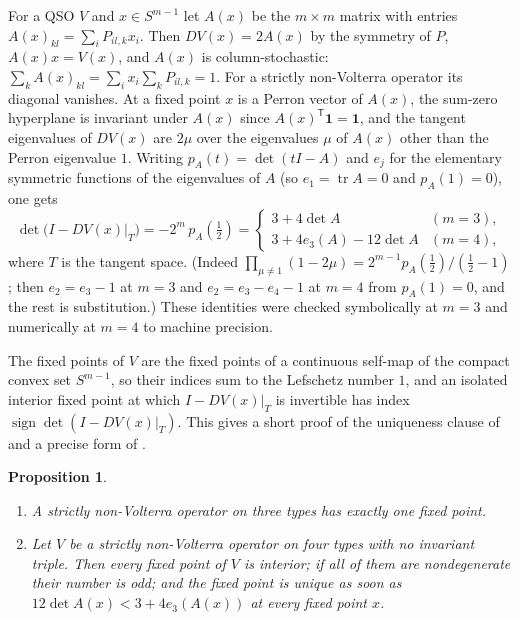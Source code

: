 \documentclass[11pt]{amsart}
\newtheorem{proposition}[theorem]{Proposition}
\theoremstyle{definition}
\newcommand{\Simp}{S^{m-1}}
\DeclareMathOperator{\tr}{tr}
\begin{document}
For a QSO $V$ and $x\in\Simp$ let $A(x)$ be the $m\times m$ matrix with entries $A(x)_{kl}=\sum_iP_{il,k}x_i$. Then $DV(x)=2A(x)$ by the symmetry of $P$, $A(x)x=V(x)$, and $A(x)$ is column-stochastic: $\sum_kA(x)_{kl}=\sum_ix_i\sum_kP_{il,k}=1$. For a strictly non-Volterra operator its diagonal vanishes. At a fixed point $x$ is a Perron vector of $A(x)$, the sum-zero hyperplane is invariant under $A(x)$ since $A(x)^{\mathsf T}\mathbf 1=\mathbf 1$, and the tangent eigenvalues of $DV(x)$ are $2\mu$ over the eigenvalues $\mu$ of $A(x)$ other than the Perron eigenvalue $1$. Writing $p_A(t)=\det(tI-A)$ and $e_j$ for the elementary symmetric functions of the eigenvalues of $A$ (so $e_1=\tr A=0$ and $p_A(1)=0$), one gets
\begin{equation}\label{eq:index}
\det\big(I-DV(x)\big|_{T}\big)=-2^m\,p_A(\tfrac12)=
\begin{cases}3+4\det A & (m=3),\\[2pt] 3+4e_3(A)-12\det A & (m=4),\end{cases}
\end{equation}
where $T$ is the tangent space. (Indeed $\prod_{\mu\ne1}(1-2\mu)=2^{m-1}p_A(\frac12)/(\frac12-1)$; then $e_2=e_3-1$ at $m=3$ and $e_2=e_3-e_4-1$ at $m=4$ from $p_A(1)=0$, and the rest is substitution.) These identities were checked symbolically at $m=3$ and numerically at $m=4$ to machine precision.

The fixed points of $V$ are the fixed points of a continuous self-map of the compact convex set $\Simp$, so their indices sum to the Lefschetz number $1$, and an isolated interior fixed point at which $I-DV(x)|_T$ is invertible has index $\operatorname{sign}\det(I-DV(x)|_T)$. This gives a short proof of the uniqueness clause of  and a precise form of .

\begin{proposition}\label{prop:index}
\leavevmode
\begin{enumerate}
\item[(i)] A strictly non-Volterra operator on three types has exactly one fixed point.
\item[(ii)] Let $V$ be a strictly non-Volterra operator on four types with no invariant triple. Then every fixed point of $V$ is interior; if all of them are nondegenerate their number is odd; and the fixed point is unique as soon as $12\det A(x)<3+4e_3(A(x))$ at every fixed point $x$.
\end{enumerate}
\end{proposition}
\end{document}
